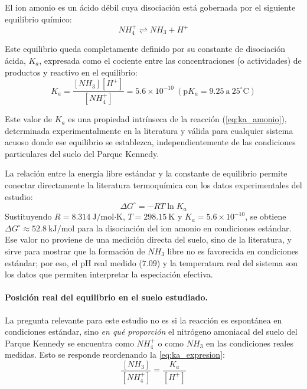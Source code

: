 \documentclass[fleqn]{jaes}
\begin{document}
El ion amonio es un ácido débil cuya disociación está gobernada por el siguiente equilibrio químico:
\begin{equation}
NH_4^+ \rightleftharpoons NH_3 + H^+
\label{eq:ka_amonio}
\end{equation}

Este equilibrio queda completamente definido por su constante de disociación ácida, $K_a$, expresada como el cociente entre las concentraciones (o actividades) de productos y reactivo en el equilibrio:
\begin{equation}
K_a = \frac{[NH_3][H^+]}{[NH_4^+]} = 5.6 \times 10^{-10}~(\text{p}K_a = 9.25~\text{a}~25^\circ\text{C})
\label{eq:ka_expresion}
\end{equation}

Este valor de $K_a$ es una propiedad intrínseca de la reacción (\cref{eq:ka_amonio}), determinada experimentalmente en la literatura y válida para cualquier sistema acuoso donde ese equilibrio se establezca, independientemente de las condiciones particulares del suelo del Parque Kennedy.

La relación entre la energía libre estándar y la constante de equilibrio permite conectar directamente la literatura termoquímica con los datos experimentales del estudio:
\begin{equation}
\Delta G^\circ = -RT \ln K_a
\label{eq:gibbs_nh4}
\end{equation}
Sustituyendo $R=8.314~\text{J/mol·K}$, $T=298.15~\text{K}$ y $K_a=5.6\times10^{-10}$, se obtiene $\Delta G^\circ \approx 52.8~\text{kJ/mol}$ para la disociación del ion amonio en condiciones estándar. Ese valor no proviene de una medición directa del suelo, sino de la literatura, y sirve para mostrar que la formación de $NH_3$ libre no es favorecida en condiciones estándar; por eso, el pH real medido ($7.09$) y la temperatura real del sistema son los datos que permiten interpretar la especiación efectiva.

\paragraph{Posición real del equilibrio en el suelo estudiado.} La pregunta relevante para este estudio no es si la reacción es espontánea en condiciones estándar, sino \textit{en qué proporción} el nitrógeno amoniacal del suelo del Parque Kennedy se encuentra como $NH_4^+$ o como $NH_3$ en las condiciones reales medidas. Esto se responde reordenando la \cref{eq:ka_expresion}:
\begin{equation}
\frac{[NH_3]}{[NH_4^+]} = \frac{K_a}{[H^+]}
\label{eq:razon_especies}
\end{equation}
\end{document}
